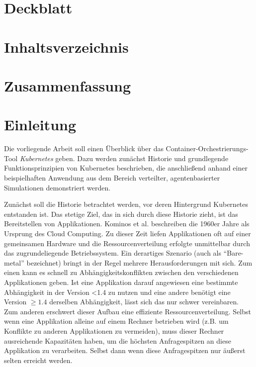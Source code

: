 \documentclass[11pt,a4paper]{article}
\begin{document}
% 

\section{Deckblatt}
\section{Inhaltsverzeichnis}



\section{Zusammenfassung}

\section{Einleitung}
\label{sec:einleitung}
Die vorliegende Arbeit soll einen Überblick über das Container-Orchestrierungs-Tool \emph{Kubernetes} geben. 
Dazu werden zunächst Historie und grundlegende Funktionsprinzipien von Kubernetes beschrieben, die anschließend
anhand einer beispielhaften Anwendung aus dem Bereich verteilter, agentenbasierter Simulationen demonstriert werden.

Zunächst soll die Historie betrachtet werden, vor deren Hintergrund Kubernetes entstanden ist.
Das stetige Ziel, das in sich durch diese Historie zieht, ist das Bereitstellen von Applikationen.
Kominos et al. \cite{7899247} beschreiben die 1960er Jahre als Ursprung des Cloud Computing.
Zu dieser Zeit liefen Applikationen oft auf einer gemeinsamen Hardware und die Ressourcenverteilung erfolgte unmittelbar durch das zugrundeliegende Betriebssystem.
Ein derartiges Szenario (auch als ``Bare-metal'' bezeichnet) bringt in der Regel mehrere Herausforderungen mit sich.
Zum einen kann es schnell zu Abhängigkeitskonflikten zwischen den verschiedenen Applikationen geben.
Ist eine Applikation darauf angewiesen eine bestimmte Abhängigkeit in der Version <1.4 zu nutzen und eine andere
benötigt eine Version \(\geq 1.4\) derselben Abhängigkeit, lässt sich das nur schwer vereinbaren.
Zum anderen erschwert dieser Aufbau eine effiziente Ressourcenverteilung. Selbst wenn eine Applikation alleine auf einem Rechner betrieben wird (z.B. um Konflikte zu anderen
Applikationen zu vermeiden), muss dieser Rechner ausreichende Kapazitäten haben, um die höchsten Anfragespitzen an diese Applikation zu verarbeiten.
Selbst dann wenn diese Anfragespitzen nur äußerst selten erreicht werden.
\end{document}

